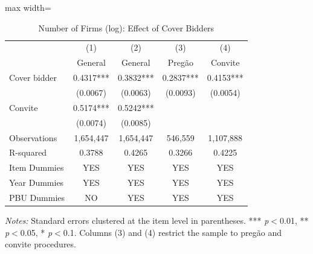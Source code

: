 \begin{table}[htbp]
\centering
\caption{Number of Firms (log): Effect of Cover Bidders}
\label{tab:nfirms}
\begin{adjustbox}{max width=\textwidth}
\begin{threeparttable}
\small
\begin{tabular}{lcccc}
\toprule
 & (1) & (2) & (3) & (4) \\
 & General & General & Preg\~{a}o & Convite \\
\midrule
Cover bidder & 0.4317*** & 0.3832*** & 0.2837*** & 0.4153*** \\
 & (0.0067) & (0.0063) & (0.0093) & (0.0054) \\
Convite & 0.5174*** & 0.5242*** &  &  \\
 & (0.0074) & (0.0085) &  &  \\
\midrule
Observations & 1,654,447 & 1,654,447 & 546,559 & 1,107,888 \\
R-squared & 0.3788 & 0.4265 & 0.3266 & 0.4225 \\
Item Dummies & YES & YES & YES & YES \\
Year Dummies & YES & YES & YES & YES \\
PBU Dummies & NO & YES & YES & YES \\
\bottomrule
\end{tabular}
\begin{tablenotes}
\small
\item \textit{Notes:} Standard errors clustered at the item level in parentheses. *** \textit{p}$<$0.01, ** \textit{p}$<$0.05, * \textit{p}$<$0.1. Columns (3) and (4) restrict the sample to preg\~{a}o and convite procedures.
\end{tablenotes}
\end{threeparttable}
\end{adjustbox}
\end{table}
